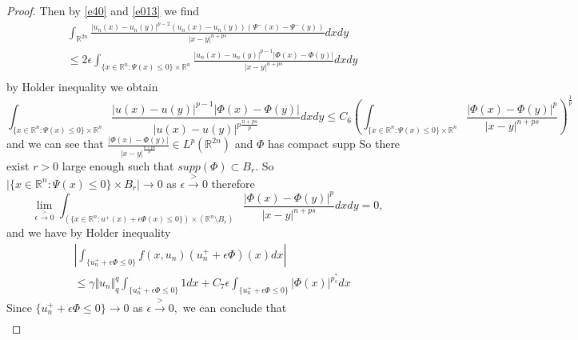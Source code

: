 \documentclass[10pt,twoside,reqno,centertags,draft]{amsart}
\begin{document}
\begin{proof}
{}
Then by \ref{e40} and \ref{e013} we find
\begin{equation}
\begin{aligned}
&\int_{\mathbb{R}^{2n}}\frac{\vert u_n(x) -u_n(y)\vert^{p -2}(u_n(x) -u_n(y))(\Psi^{-}(x) -\Psi^{-}(y))}{\vert x -y\vert^{n +ps}}dxdy \\
& \leq 2\epsilon\int_{\{ x \in \mathbb{R}^n : \Psi(x) \leq 0\}\times \mathbb{R}^n}\frac{\vert u_n(x) -u_n(y)\vert^{p -1}\vert\Phi(x) -\Phi(y)\vert}{\vert x -y\vert^{n +ps}}dxdy \\
\end{aligned}
\end{equation}
by Holder inequality we obtain 
{\tiny
\begin{equation}
\int_{\{ x \in \mathbb{R}^n : \Psi(x) \leq 0\}\times \mathbb{R}^n}\frac{\vert u(x) -u(y)\vert^{p -1}\vert \Phi(x) -\Phi
(y)\vert}{\vert u(x) -u(y)\vert^{p\frac{n +ps}{p}}}dxdy\leq C_6 \left( \int_{\{ x \in \mathbb{R}^n : \Psi(x) \leq 0\}\times \mathbb{R}^n}\frac{\vert \Phi(x) -\Phi(y)\vert^{p}}{\vert x -y\vert^{n +ps}}\right)^{\frac{1}{p}}
\end{equation}
}
and we can see that $ \frac{\vert\Phi(x) -\Phi(y)\vert}{\vert x -y\vert^{\frac{n +ps}{p}}} \in L^{p}(\mathbb{R}^{2n})$ and $ \Phi$ has compact supp So there exist $ r >0$ large enough such that $ supp(\Phi) \subset B_{r}.$ So $ \vert \{ x \in \mathbb{R}^n : \Psi(x) \leq 0\} \times B_{r}\vert \longrightarrow 0$ as $ \epsilon \xrightarrow{>} 0$
therefore
\begin{equation}\label{e017}
\lim_{\epsilon \xrightarrow{>} 0}\int_{(\{ x \in \mathbb{R}^n : u^+(x) +\epsilon \Phi(x) \leq 0\})\times(\mathbb{R}^n  \setminus B_{r})}\frac{\vert \Phi(x) -\Phi(y)\vert^{p}}{\vert x -y\vert^{n +ps}}dxdy =0,
\end{equation}
and we have by Holder inequality
\begin{equation*}
\begin{aligned}
&\left\vert \int_{\{u_n^+ +\epsilon\Phi \leq 0\}}f(x, u_n)(u_n^+ +\epsilon\Phi)(x)dx\right\vert \\
&\leq \gamma \Vert u_n\Vert_{q}^{q}\int_{\{u_n^+ +\epsilon\Phi \leq 0\}}1dx +C_{7}\epsilon\int_{\{u_n^+ +\epsilon\Phi \leq 0\}}\vert\Phi(x)\vert^{p_s^*}dx
\end{aligned}
\end{equation*}
Since $ \{u_n^+ +\epsilon\Phi \leq 0\} \longrightarrow 0$ as $ \epsilon \xrightarrow{>} 0,$ we can conclude that
\begin{equation}\label{e018}
\begin{aligned}

\end{aligned}
\end{equation}
\end{proof}
\end{document}

